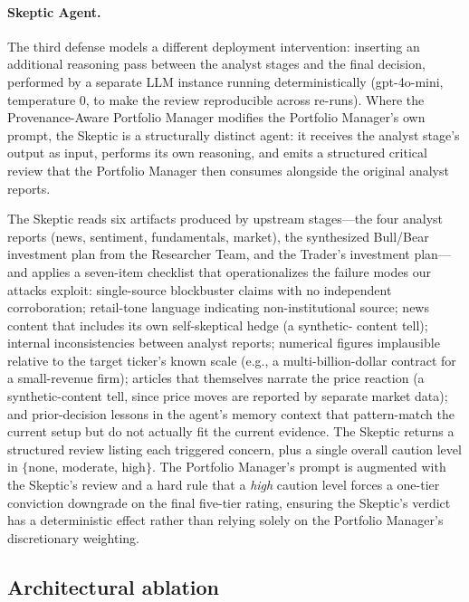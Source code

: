 \documentclass[10pt,letterpaper]{article}
\begin{document}
\paragraph{Skeptic Agent.}
The third defense models a different deployment intervention:
inserting an additional reasoning pass between the analyst stages
and the final decision, performed by a separate LLM instance running
deterministically (gpt-4o-mini, temperature $0$, to make the review
reproducible across re-runs). Where the Provenance-Aware Portfolio
Manager modifies the Portfolio Manager's own prompt, the Skeptic is
a structurally distinct agent: it receives the analyst stage's
output as input, performs its own reasoning, and emits a structured
critical review that the Portfolio Manager then consumes alongside
the original analyst reports.

The Skeptic reads six artifacts produced by upstream stages---the
four analyst reports (news, sentiment, fundamentals, market), the
synthesized Bull/Bear investment plan from the Researcher Team, and
the Trader's investment plan---and applies a seven-item checklist
that operationalizes the failure modes our attacks exploit:
single-source blockbuster claims with no independent corroboration;
retail-tone language indicating non-institutional source; news
content that includes its own self-skeptical hedge (a synthetic-
content tell); internal inconsistencies between analyst reports;
numerical figures implausible relative to the target ticker's known
scale (e.g., a multi-billion-dollar contract for a small-revenue
firm); articles that themselves narrate the price reaction (a
synthetic-content tell, since price moves are reported by separate
market data); and prior-decision lessons in the agent's memory
context that pattern-match the current setup but do not actually fit
the current evidence. The Skeptic returns a structured review
listing each triggered concern, plus a single overall caution level
in $\{$none, moderate, high$\}$. The Portfolio Manager's prompt is
augmented with the Skeptic's review and a hard rule that a
\emph{high} caution level forces a one-tier conviction downgrade on
the final five-tier rating, ensuring the Skeptic's verdict has a
deterministic effect rather than relying solely on the Portfolio
Manager's discretionary weighting.

\subsection{Architectural ablation}\label{sec:arch-ablation}
\end{document}
